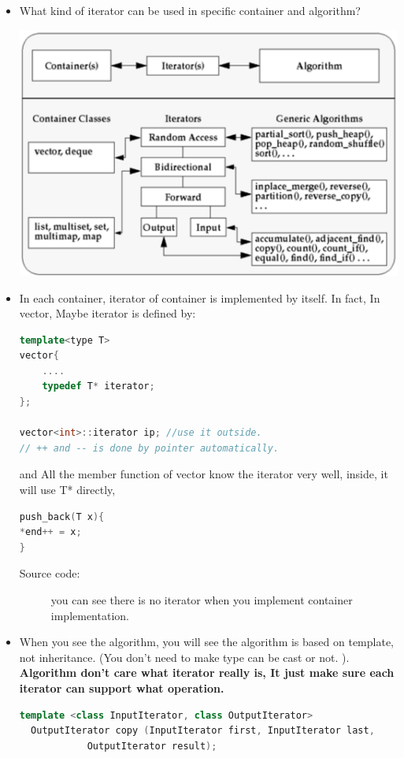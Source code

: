 \documentclass[a4paper,11pt,twoside]{book}
\begin{document}
\begin{itemize}
\item What kind of iterator can be used in specific container and algorithm?
\begin{center}
	  \includegraphics[scale=0.56]{pics/container_it.png}
\end{center}

\item In each container, iterator of container is implemented by itself. In fact, In vector, Maybe iterator is defined by:
\begin{lstlisting}[frame=single, language=c++]
template<type T>
vector{
	....
	typedef T* iterator;
};

vector<int>::iterator ip; //use it outside.
// ++ and -- is done by pointer automatically.
\end{lstlisting}

and All the member function of vector know the iterator very well, inside, it will use T* directly,
\begin{lstlisting}[frame=single, language=c++]
push_back(T x){
*end++ = x;
}  
\end{lstlisting}
\begin{description}
	\item[Source code:] you can see there is no iterator when you implement container implementation.
\end{description}


\item When you see the algorithm,  you will see the algorithm is based on template, not inheritance. (You don't need to make type can be cast or not. ). \textbf{Algorithm don't care what iterator really is, It just make sure each iterator can support what operation. }
\begin{lstlisting}[frame=single, language=c++]
template <class InputIterator, class OutputIterator>
  OutputIterator copy (InputIterator first, InputIterator last,
            OutputIterator result);
\end{lstlisting}



\end{itemize}
\end{document}
